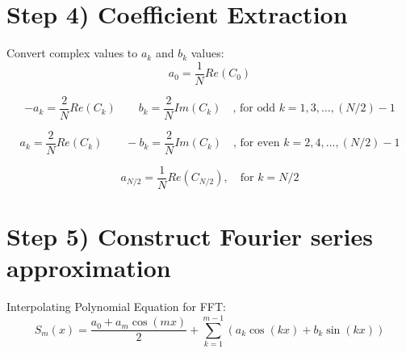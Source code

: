 \documentclass[12pt]{article}
\begin{document}
\section*{Step 4) Coefficient Extraction}
Convert complex values to $a_k$ and $b_k$ values:
\[a_0 = \frac{1}{N}Re(C_0)\]

\[-a_k = \frac{2}{N}Re(C_k) \quad \quad b_k = \frac{2}{N}Im(C_k) \quad \text{, for odd } k=1,3,\ldots,(N/2)-1\]

\[a_k = \frac{2}{N}Re(C_k) \quad \quad -b_k = \frac{2}{N}Im(C_k) \quad \text{, for even } k=2,4,\ldots,(N/2)-1\]

\[a_{N/2} = \frac{1}{N}Re(C_{N/2}), \quad \text{for } k = N/2\]

\section*{Step 5) Construct Fourier series approximation}
Interpolating Polynomial Equation for FFT:
\[S_m(x) = \frac{a_0 + a_m\cos(mx)}{2} + \sum_{k=1}^{m-1}(a_k\cos(kx) + b_k\sin(kx))\]
\end{document}
